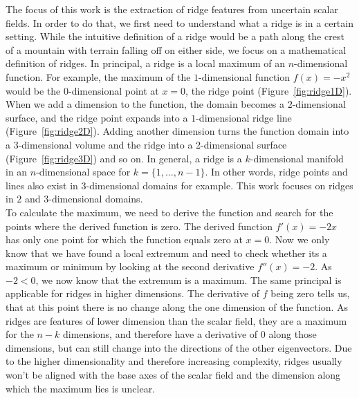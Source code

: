The focus of this work is the extraction of ridge features from
uncertain scalar fields. In order to do that, we first need to
understand what a ridge is in a certain setting. While the intuitive
definition of a ridge would be a path along the crest of a mountain with
terrain falling off on either side, we focus on a mathematical
definition of ridges. In principal, a ridge is a local maximum of an
$n$-dimensional function. For example, the maximum of the
$1$-dimensional function $f(x) = -x^2$ would be the $0$-dimensional
point at $x=0$, the ridge point (Figure~\ref{fig:ridge1D}). When we add
a dimension to the function, the domain becomes a $2$-dimensional
surface, and the ridge point expands into a $1$-dimensional ridge line
(Figure~\ref{fig:ridge2D}). Adding another dimension turns the function
domain into a $3$-dimensional volume and the ridge into a 2-dimensional
surface (Figure~\ref{fig:ridge3D}) and so on. In general, a ridge is a
$k$-dimensional manifold in an $n$-dimensional space for $k=\{1,
\dots, n-1\}$. In other words, ridge points and lines also exist in
$3$-dimensional domains for example. This work focuses on ridges in $2$
and $3$-dimensional domains.\\
\indent To calculate the maximum, we need to derive the function and
search for the points where the derived function is zero. The derived
function $f'(x)=-2x$ has only one point for which the function equals
zero at $x=0$. Now we only know that we have found a local extremum and
need to check whether its a maximum or minimum by looking at the second
derivative $f''(x)=-2$. As $-2 < 0$, we now know that the extremum is a
maximum. The same principal is applicable for ridges in higher
dimensions. The derivative of $f$ being zero tells us, that at this
point there is no change along the one dimension of the function. As
ridges are features of lower dimension than the scalar field, they are a
maximum for the $n-k$ dimensions, and therefore have a derivative of $0$
along those dimensions, but can still change into the directions of the
other eigenvectors. Due to the higher dimensionality and therefore
increasing complexity, ridges usually won't be aligned with the base
axes of the scalar field and the dimension along which the maximum lies
is unclear.\\
